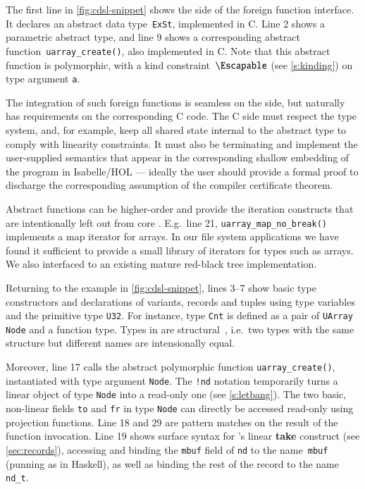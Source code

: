 \documentclass[9pt\ifFinal\else,preprint,nocopyrightspace\fi,\ifAlpha\else natbib,authoryear\fi]{sigplanconf}
\newcommand{\code}[1]{\texttt{#1}}
\begin{document}
\newcommand{\cdslfunc}[1]{\texttt{\textcolor{funccol}{#1}()}\xspace}
\newcommand{\cdslvar}[1]{\texttt{#1}\xspace}
\newcommand{\cdsltype}[1]{\texttt{\textcolor{typecol}{#1}}\xspace}
\newcommand{\cdsltypenospace}[1]{\texttt{\textcolor{typecol}{#1}}}

\noindent
The first line in \autoref{fig:cdsl-snippet} shows the \cdsl side of the
foreign function interface. It declares an abstract \CDSL data
type~\cdsltype{ExSt}, implemented in C. Line 2 shows a parametric abstract
type, and line 9 shows a corresponding abstract
function~\cdslfunc{uarray\_create}, also implemented in C. Note that this
abstract function is polymorphic, with a kind constraint~$\Escapable$ (see
\autoref{s:kinding}) on type argument \cdslvar{a}.

The integration of such foreign functions is seamless on the \CDSL side, but
naturally has requirements on the corresponding C code. The C side must
respect the \CDSL type system, and, for example, keep all shared state
internal to the abstract type to comply with linearity constraints. It must
also be terminating and implement the user-supplied semantics that appear in
the corresponding shallow embedding of the \CDSL program in Isabelle/HOL ---
ideally the user should provide a formal proof to discharge the corresponding
assumption of the compiler certificate theorem.

Abstract functions can be higher-order and provide the
iteration constructs that are intentionally left out from core \cdsl.
E.g.\ line 21, \cdslfunc{uarray\_map\_no\_break} implements a map iterator
for arrays. In our
file system applications we have found it sufficient to provide a small
library of iterators for types such as arrays. We also interfaced to an
existing mature red-black tree implementation.

Returning to the example in \autoref{fig:cdsl-snippet}, lines 3--7 show basic
type constructors and declarations of variants, records and tuples
using type variables and the primitive type \cdsltype{U32}. For instance, type
\cdsltype{Cnt} is defined as a pair of \cdsltype{UArray Node} and a function
type. Types in \cdsl are structural~\citep{Pierce_02}, i.e.\ two types with
the same structure but different names are intensionally equal.

Moreover, line 17 calls the abstract polymorphic function   
\cdslfunc{uarray\_create}, instantiated with type argument \cdsltype{Node}.
The \code{!nd} notation temporarily turns a linear object of type
\cdsltype{Node} into a read-only one (see \autoref{s:letbang}). The two
basic, non-linear fields \code{to} and \code{fr} in type \cdsltype{Node} can
directly be accessed read-only using projection functions.
Line 18 and 29 are pattern matches on the result of the function invocation.
Line 19 shows surface syntax for \CDSL's linear \textbf{take} construct (see
\autoref{sec:records}), accessing and binding the \code{mbuf} field of
\code{nd} to the name~\code{mbuf} (punning as in Haskell), as well as
binding the rest of the record to the name \code{nd\_t}.
\end{document}
